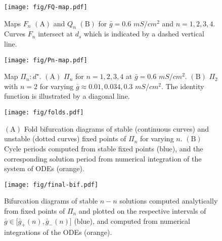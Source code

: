 \documentclass[utf8, draft]{frontiersFPHY} %
\newcommand{\gbar}{\bar g}
\begin{document}
\begin{figure}[h!]
  \centering
  \texttt{[image: fig/FQ-map.pdf]}
  \caption{Maps $F_n$ $\bm{\mathrm{(A)}}$ and $Q_n$ $\bm{\mathrm{(B)}}$ for $\gbar=0.6$ $\si{mS/cm^{2}}$ and $n=1,2,3,4$. Curves $F_n$ intersect at $d_{s}$ which is indicated by a dashed vertical line.~\label{fig:FQ-map}}
\end{figure}

\begin{figure}[h!]
  \centering
  \texttt{[image: fig/Pn-map.pdf]}
  \caption{Map $\Pi_{n}:d^{\star}$. $\bm{\mathrm{(A)}}$ $\Pi_{n}$ for $n=1,2,3,4$ at $\gbar=0.6$ $\si{mS/cm^{2}}$. $\bm{\mathrm{(B)}}$ $\Pi_{2}$ with $n=2$ for varying $\gbar \approx 0.01, 0.034, 0.3$ $\si{mS/cm^{2}}$. The identity function is illustrated by a diagonal line.~\label{fig:Pn-map}}
\end{figure}

\begin{figure}[h!]
  \centering
  \texttt{[image: fig/folds.pdf]}
  \caption{$\bm{\mathrm{(A)}}$ Fold bifurcation diagrams of stable (continuous curves) and unstable (dotted curves) fixed points of $\Pi_{n}$ for varying $n$. $\bm{\mathrm{(B)}}$ Cycle periods computed from stable fixed points (blue), and the corresponding solution period from numerical integration of the system of ODEs (orange).~\label{fig:folds}}
\end{figure}

\begin{figure}[h!]
  \centering
  \texttt{[image: fig/final-bif.pdf]}
  \caption{Bifurcation diagrams of stable $n-n$ solutions computed analytically from fixed points of $\Pi_n$ and plotted on the respective intervals of $\gbar\in \big[\gbar_+(n),\gbar_-(n)\big]$ (blue), and computed from numerical integrations of the ODEs (orange).~\label{fig:final-bif}}
\end{figure}
\end{document}
